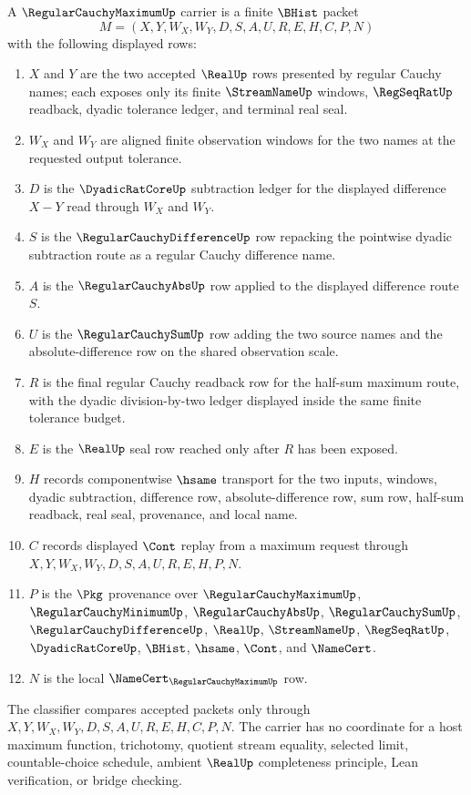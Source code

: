 \begin{definition}\label{def:regular-cauchy-maximum-carrier}
A $\RegularCauchyMaximumUp$ carrier is a finite $\BHist$ packet
$$
M=(X,Y,W_X,W_Y,D,S,A,U,R,E,H,C,P,N)
$$
with the following displayed rows:
\begin{enumerate}
\item $X$ and $Y$ are the two accepted $\RealUp$ rows presented by regular Cauchy names; each exposes only its finite $\StreamNameUp$ windows, $\RegSeqRatUp$ readback, dyadic tolerance ledger, and terminal real seal.
\item $W_X$ and $W_Y$ are aligned finite observation windows for the two names at the requested output tolerance.
\item $D$ is the $\DyadicRatCoreUp$ subtraction ledger for the displayed difference $X-Y$ read through $W_X$ and $W_Y$.
\item $S$ is the $\RegularCauchyDifferenceUp$ row repacking the pointwise dyadic subtraction route as a regular Cauchy difference name.
\item $A$ is the $\RegularCauchyAbsUp$ row applied to the displayed difference route $S$.
\item $U$ is the $\RegularCauchySumUp$ row adding the two source names and the absolute-difference row on the shared observation scale.
\item $R$ is the final regular Cauchy readback row for the half-sum maximum route, with the dyadic division-by-two ledger displayed inside the same finite tolerance budget.
\item $E$ is the $\RealUp$ seal row reached only after $R$ has been exposed.
\item $H$ records componentwise $\hsame$ transport for the two inputs, windows, dyadic subtraction, difference row, absolute-difference row, sum row, half-sum readback, real seal, provenance, and local name.
\item $C$ records displayed $\Cont$ replay from a maximum request through $X,Y,W_X,W_Y,D,S,A,U,R,E,H,P,N$.
\item $P$ is the $\Pkg$ provenance over $\RegularCauchyMaximumUp$, $\RegularCauchyMinimumUp$, $\RegularCauchyAbsUp$, $\RegularCauchySumUp$, $\RegularCauchyDifferenceUp$, $\RealUp$, $\StreamNameUp$, $\RegSeqRatUp$, $\DyadicRatCoreUp$, $\BHist$, $\hsame$, $\Cont$, and $\NameCert$.
\item $N$ is the local $\NameCert_{\RegularCauchyMaximumUp}$ row.
\end{enumerate}
The classifier compares accepted packets only through $X,Y,W_X,W_Y,D,S,A,U,R,E,H,C,P,N$. The carrier has no coordinate for a host maximum function, trichotomy, quotient stream equality, selected limit, countable-choice schedule, ambient $\RealUp$ completeness principle, Lean verification, or bridge checking.
\end{definition}

